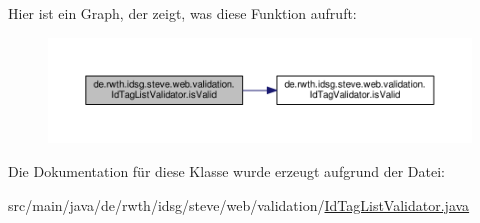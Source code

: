 Hier ist ein Graph, der zeigt, was diese Funktion aufruft\+:\nopagebreak
\begin{figure}[H]
\begin{center}
\leavevmode
\includegraphics[width=350pt]{classde_1_1rwth_1_1idsg_1_1steve_1_1web_1_1validation_1_1_id_tag_list_validator_a952fb5b36fbd18558318c810d877a3cb_cgraph}
\end{center}
\end{figure}




Die Dokumentation für diese Klasse wurde erzeugt aufgrund der Datei\+:\begin{DoxyCompactItemize}
\item 
src/main/java/de/rwth/idsg/steve/web/validation/\hyperlink{_id_tag_list_validator_8java}{Id\+Tag\+List\+Validator.\+java}\end{DoxyCompactItemize}
